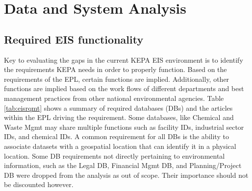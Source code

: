 \chapter{Data and System Analysis}

\section{Required EIS functionality}

Key to evaluating the gaps in the current KEPA EIS environment is to identify the requirements KEPA needs in order to properly function. Based on the requirements of the EPL, certain functions are implied. Additionally, other functions are implied based on the work flows of different departments and best management practices from other national environmental agencies. Table \ref{tab:eisrqmt} shows a summary of required databases (DBs) and the articles within the EPL driving the requirement. Some databases, like Chemical and Waste Mgmt may share multiple functions such as facility IDs, industrial sector IDs, and chemical IDs. A common requirement for all DBs is the ability to associate datasets with a geospatial location that can identify it in a physical location. Some DB requirements not directly pertaining to environmental information, such as the Legal DB, Financial Mgmt DB, and Planning/Project DB were dropped from the analysis as out of scope. Their importance should not be discounted however.

